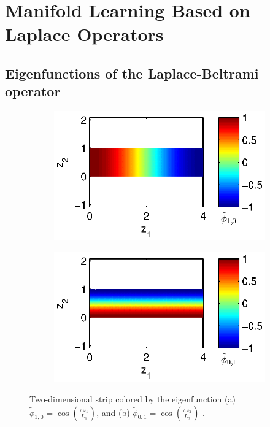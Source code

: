 \documentclass[preprint]{elsarticle}
\begin{document}
\section{Manifold Learning Based on Laplace Operators}

\subsection{Eigenfunctions of the Laplace-Beltrami operator}

\begin{figure}[t]
\centering
\begin{subfigure}{0.45\textwidth}
\includegraphics[width=\textwidth]{strip_cnts1}
\caption{}
\end{subfigure}
%
\begin{subfigure}{0.45\textwidth}
\includegraphics[width=\textwidth]{strip_cnts2}
\caption{}
\end{subfigure}
\caption{Two-dimensional strip colored by the eigenfunction (a) $\tilde{\phi}_{1, 0} = \cos \left( \frac{\pi z_1}{L_1} \right)$, and (b) $\tilde{\phi}_{0, 1} = \cos \left( \frac{\pi z_2}{L_2} \right)$ .}
\label{fig:strip_efuncs}
\end{figure}
\end{document}
